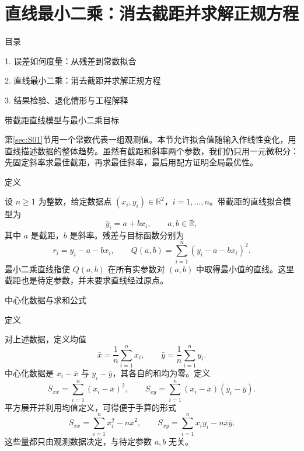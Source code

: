 \documentclass[aspectratio=169,10pt,fontset=fandol]{ctexbeamer}
\makeatletter
\newcommand{\mathagentsectionlabelcontext}{%
\protected@edef\@currentlabel{\thesection}%
\edef\@currentHref{Outline\the\c@part.\the\c@section}%
}
\makeatother
\begin{document}
\section{直线最小二乘：消去截距并求解正规方程}
\begin{frame}[t,fragile]{目录}
\normalsize
{\color{black}\normalsize 1. 误差如何度量：从残差到常数拟合\par}\vspace{0.22em}
{\color{blue}\normalsize 2. 直线最小二乘：消去截距并求解正规方程\par}\vspace{0.22em}
{\color{gray!40}\normalsize 3. 结果检验、退化情形与工程解释\par}\vspace{0.22em}
\end{frame}
\begin{frame}[t,fragile]{带截距直线模型与最小二乘目标}
\normalsize
{\normalsize
\mathagentsectionlabelcontext
\label{sec:S02}

}
{\normalsize
第\ref{sec:S01}节用一个常数代表一组观测值。本节允许拟合值随输入作线性变化，用直线描述数据的整体趋势。虽然有截距和斜率两个参数，我们仍只用一元微积分：先固定斜率求最佳截距，再求最佳斜率，最后用配方证明全局最优性。\par

}
\begin{block}{定义}
{\normalsize
设 $n\geq1$ 为整数，给定数据点 $(x_i,y_i)\in\mathbb{R}^2$，$i=1,\ldots,n$。带截距的直线拟合模型为
\[
\hat{y}_i=a+bx_i,\qquad a,b\in\mathbb{R},
\]
其中 $a$ 是截距，$b$ 是斜率。残差与目标函数分别为
\[
r_i=y_i-a-bx_i,\qquad
Q(a,b)=\sum_{i=1}^{n}(y_i-a-bx_i)^2.
\]
最小二乘直线指使 $Q(a,b)$ 在所有实参数对 $(a,b)$ 中取得最小值的直线。这里截距也是待定参数，并未要求直线经过原点。

}
\end{block}
\end{frame}
\begin{frame}[t,fragile]{中心化数据与求和公式}
\small
\begin{block}{定义}
{\small
对上述数据，定义均值
\[
\bar{x}=\frac1n\sum_{i=1}^{n}x_i,\qquad
\bar{y}=\frac1n\sum_{i=1}^{n}y_i.
\]
中心化数据是 $x_i-\bar{x}$ 与 $y_i-\bar{y}$，其各自的和均为零。定义
\[
S_{xx}=\sum_{i=1}^{n}(x_i-\bar{x})^2,\qquad
S_{xy}=\sum_{i=1}^{n}(x_i-\bar{x})(y_i-\bar{y}).
\]
平方展开并利用均值定义，可得便于手算的形式
\[
S_{xx}=\sum_{i=1}^{n}x_i^2-n\bar{x}^2,\qquad
S_{xy}=\sum_{i=1}^{n}x_i y_i-n\bar{x}\bar{y}.
\]
这些量都只由观测数据决定，与待定参数 $a,b$ 无关。

}
\end{block}
\end{frame}
\end{document}
